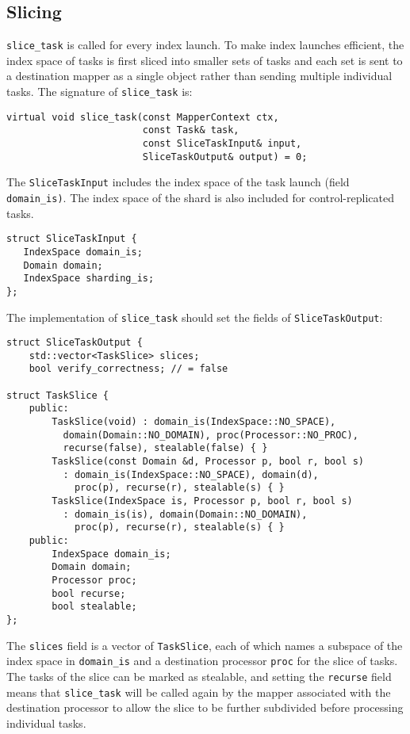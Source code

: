 \subsection{Slicing}
{\tt slice\_task} is called for every index launch.  To make index launches efficient, the index space of tasks is first sliced into smaller sets of tasks and each set is sent to a destination mapper as a single object rather than sending
multiple individual tasks.  The signature of {\tt slice\_task} is:
\begin{lstlisting}
virtual void slice_task(const MapperContext ctx,
                        const Task& task,
                        const SliceTaskInput& input,
                        SliceTaskOutput& output) = 0;
\end{lstlisting}


The {\tt SliceTaskInput} includes the index space of the task launch (field {\tt domain\_is)}.  The index space of the shard is also included for control-replicated tasks.
\begin{lstlisting}
struct SliceTaskInput {
   IndexSpace domain_is;
   Domain domain;
   IndexSpace sharding_is;
};
\end{lstlisting}
The implementation of {\tt slice\_task} should set the fields of {\tt SliceTaskOutput}:
\begin{lstlisting}
struct SliceTaskOutput {
    std::vector<TaskSlice> slices;
    bool verify_correctness; // = false                                                                                            

struct TaskSlice {
    public:
        TaskSlice(void) : domain_is(IndexSpace::NO_SPACE),
          domain(Domain::NO_DOMAIN), proc(Processor::NO_PROC),
          recurse(false), stealable(false) { }
        TaskSlice(const Domain &d, Processor p, bool r, bool s)
          : domain_is(IndexSpace::NO_SPACE), domain(d),
            proc(p), recurse(r), stealable(s) { }
        TaskSlice(IndexSpace is, Processor p, bool r, bool s)
          : domain_is(is), domain(Domain::NO_DOMAIN),
            proc(p), recurse(r), stealable(s) { }
    public:
        IndexSpace domain_is;
        Domain domain;
        Processor proc;
        bool recurse;
        bool stealable;
};
\end{lstlisting}
The {\tt slices} field is a vector of {\tt TaskSlice}, each of which names a subspace of the index space in {\tt domain\_is} and a destination processor {\tt proc} for the slice of tasks.  The tasks of the slice can be marked as stealable, and setting the {\tt recurse} field
means that {\tt slice\_task} will be called again by the mapper associated with the destination processor to allow the slice to be further subdivided before processing individual tasks.

